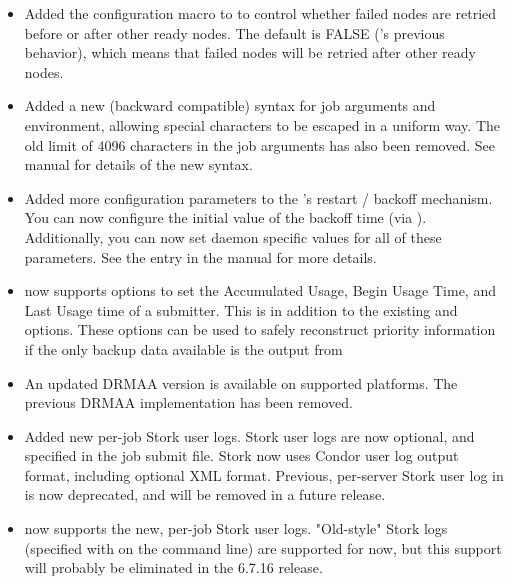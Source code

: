 \begin{itemize}
\item Added the  configuration macro to
 to control whether failed nodes are retried before
or after other ready nodes.  The default is FALSE ('s
previous behavior), which means that failed nodes will be retried
after other ready nodes.

\item Added a new (backward compatible) syntax for job arguments and
environment, allowing special characters to be escaped in a uniform
way.  The old limit of 4096 characters in the job arguments has also
been removed.  See  manual for details of the new
syntax.

\item Added more configuration parameters to the 's
restart / backoff mechanism.  You can now configure the initial value
of the backoff time (via ).
Additionally, you can now set daemon specific values for all of these
parameters.  See the  entry in the manual for more
details.

\item {} now supports   
  options to set the Accumulated Usage, Begin Usage Time, and
Last Usage time of a submitter. This is in addition to the existing
 and  options.
These options can be used to safely reconstruct priority information if
the only backup data available is the output from  

\item An updated DRMAA version is available on supported platforms.  The 
previous DRMAA implementation has been removed.

\item Added new per-job Stork user logs.  Stork user logs are now optional, and
specified in the job submit file.  Stork now uses Condor user log output
format, including optional XML format.  Previous, per-server Stork user log in
 is now deprecated, and will be removed in a future
release.

\item {} now supports the new, per-job Stork user logs.
"Old-style" Stork logs (specified with  on the
 command line) are supported for now, but this
support will probably be eliminated in the 6.7.16 release.


\end{itemize}
